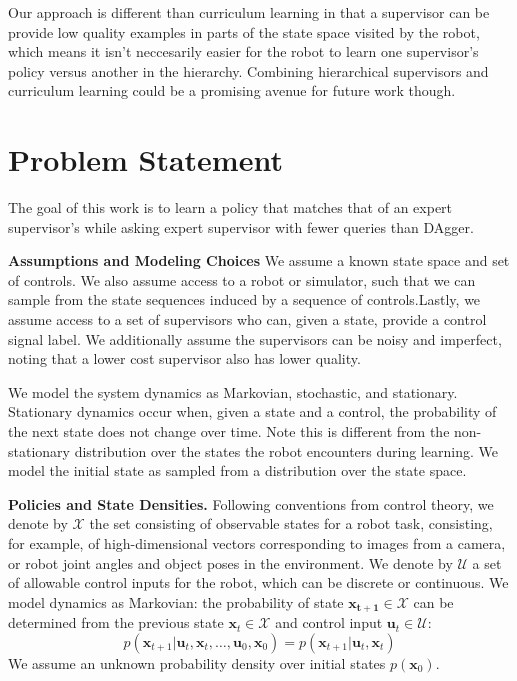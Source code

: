 \documentclass[10pt, conference]{ieeeconf}      %
\newcommand{\bu}{\mathbf{u}}
\newcommand{\bx}{\mathbf{x}}
\begin{document}
Our approach is different than curriculum learning in that a supervisor can be provide low quality examples in parts of the state space visited by the robot, which means it isn't neccesarily easier for the robot to learn one supervisor's policy versus another in the hierarchy. Combining hierarchical supervisors and curriculum learning could be a promising avenue for future work though. 

\section{Problem Statement}
The goal of this work is to learn a policy that matches that of an expert supervisor's while asking expert supervisor with fewer queries than DAgger. 


\noindent\textbf{Assumptions and Modeling Choices } 
We assume a known state space and set of controls. We also assume access to a robot or simulator, such that we  can sample from the state sequences induced by a sequence of controls.Lastly, we assume access to a set of supervisors who can, given a state, provide a control signal label. We additionally assume the supervisors can be noisy and imperfect, noting that a lower cost supervisor also has lower quality.

 We model the system dynamics as Markovian, stochastic, and stationary. Stationary dynamics occur when, given a state and a control, the probability of the next state does not change over time. Note this is different from the non-stationary distribution over the states the robot encounters during learning. We model the initial state as sampled from a distribution over the state space. 


\noindent\textbf{Policies and State Densities.}
Following conventions from control theory, we denote by $\mathcal{X}$ the set consisting of observable states for a robot task, consisting, for example, of 
high-dimensional vectors corresponding to images from a camera, or robot joint angles and object poses in the environment.
We denote by $\mathcal{U}$ a set of allowable control inputs for the robot, which can be discrete or
continuous. We model dynamics as Markovian: the probability of state $\mathbf{x_{t+1}}\in
\mathcal{X}$ can be determined from the previous state $\mathbf{x}_t\in\mathcal{X}$ and control input $\mathbf{u}_t\in
\mathcal{U}$: 
$$p(\bx_{t+1}|\bu_{t},\bx_{t}, \ldots, \bu_{0}, \bx_{0})=p(\bx_{t+1}|\bu_{t}, \bx_t)$$
We assume an unknown probability density over initial states $p(\bx_0)$.
\end{document}
